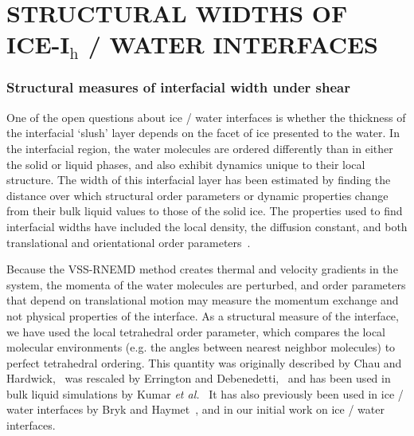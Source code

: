 \chapter{STRUCTURAL WIDTHS OF ICE-I$_\mathrm{h}$ / WATER INTERFACES}

\subsection{Structural measures of interfacial width under shear}\label{structure}
One of the open questions about ice / water interfaces is whether the
thickness of the interfacial `slush' layer depends on the facet
of ice presented to the water. In the interfacial region, the water
molecules are ordered differently than in either the solid or liquid
phases, and also exhibit dynamics unique to their local structure.
The width of this interfacial layer has been estimated by finding the
distance over which structural order parameters or dynamic properties
change from their bulk liquid values to those of the solid ice. The
properties used to find interfacial widths have included the local
density, the diffusion constant, and both translational and
orientational order
parameters~\cite{Karim1988,Karim1990,Hayward2001,Hayward2002,Bryk2002,Gay2002,Louden2013a}.

Because the VSS-RNEMD method creates thermal and velocity gradients in
the system, the momenta of the water molecules are perturbed, and
order parameters that depend on translational motion may measure the
momentum exchange and not physical properties of the interface.  As a
structural measure of the interface, we have used the local
tetrahedral order parameter, which compares the local molecular
environments (e.g. the angles between nearest neighbor molecules) to
perfect tetrahedral ordering.  This quantity was originally described
by Chau and Hardwick,~\cite{Chau1998} was rescaled by Errington and
Debenedetti,~\cite{Errington2001} and has been used in bulk liquid 
simulations by Kumar \textit{et al.}~\cite{Kumar2009} It has also
previously been used in ice / water interfaces by Bryk and
Haymet~\cite{Bryk2004}, and in our initial work on ice / water
interfaces\cite{Louden2013a}.

